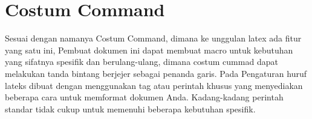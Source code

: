 \section{Costum Command}
Sesuai  dengan  namanya Costum Command, dimana ke unggulan latex ada fitur yang satu ini, Pembuat dokumen ini dapat  membuat macro untuk kebutuhan yang sifatnya spesifik dan berulang-ulang, dimana costum cummad dapat melakukan tanda bintang berjejer sebagai penanda garis. Pada Pengaturan huruf lateks dibuat dengan menggunakan tag atau perintah khusus yang menyediakan beberapa cara untuk memformat dokumen Anda. Kadang-kadang perintah standar tidak cukup untuk memenuhi beberapa kebutuhan spesifik.
